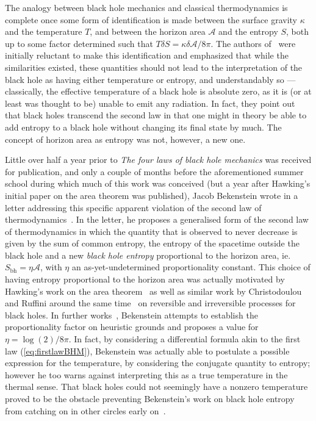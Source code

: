 \documentclass[
twoside,
openright,
frontopenright,
]{dmathesis}
\begin{document}
The analogy between black hole mechanics and classical thermodynamics is
complete once some form of identification is made between the surface gravity
$\kappa$ and the temperature $T$, and between the horizon area $\mathcal{A}$ and
the entropy $S$, both up to some factor determined such that
$T\delta S = \kappa \delta \mathcal{A} / 8\pi$. The authors
of~\cite{Bardeen:1973gs} were initially reluctant to make this identification
and emphasized that while the similarities existed, these quantities should not
lead to the interpretation of the black hole as having either temperature or
entropy, and understandably so --- classically, the effective temperature of a
black hole is absolute zero, as it is (or at least was thought to be) unable to
emit any radiation. In fact, they point out that black holes transcend the
second law in that one might in theory be able to add entropy to a black hole
without changing its final state by much. The concept of horizon area as entropy
was not, however, a new one.

Little over half a year prior to \emph{The four laws of black hole mechanics}
was received for publication, and only a couple of months before the
aforementioned summer school during which much of this work was conceived (but a
year after Hawking's initial paper on the area theorem was published), Jacob
Bekenstein wrote in a letter addressing this specific apparent violation of the
second law of thermodynamics~\cite{Bekenstein:1972tm}. In the letter, he
proposes a generalised form of the second law of thermodynamics in which the
quantity that is observed to never decrease is given by the sum of common
entropy, the entropy of the spacetime outside the black hole and a new
\emph{black hole entropy} proportional to the horizon area, ie.
$S_{\mathrm{bh}}=\eta \mathcal{A}$, with $\eta$ an as-yet-undetermined
proportionality constant. This choice of having entropy proportional to the
horizon area was actually motivated by Hawking's work on the area
theorem~\cite{Hawking:1971tu} as well as similar work by Christodoulou and
Ruffini around the same time~\cite{Christodoulou:1970wf,Christodoulou:1972kt} on
reversible and irreversible processes for black holes. In further
works~\cite{Bekenstein:1973ur,Bekenstein:1974ax}, Bekenstein attempts to
establish the proportionality factor on heuristic grounds and proposes a value
for $\eta=\log(2)/8\pi$. In fact, by considering a differential formula akin to
the first law (\cref{eq:firstlawBHM}), Bekenstein was actually able to postulate
a possible expression for the temperature, by considering the conjugate quantity
to entropy; however he too warns against interpreting this as a true temperature
in the thermal sense. That black holes could not seemingly have a nonzero
temperature proved to be the obstacle preventing Bekenstein's work on black hole
entropy from catching on in other circles early on~\cite{10.2307/24953849}.
\end{document}
